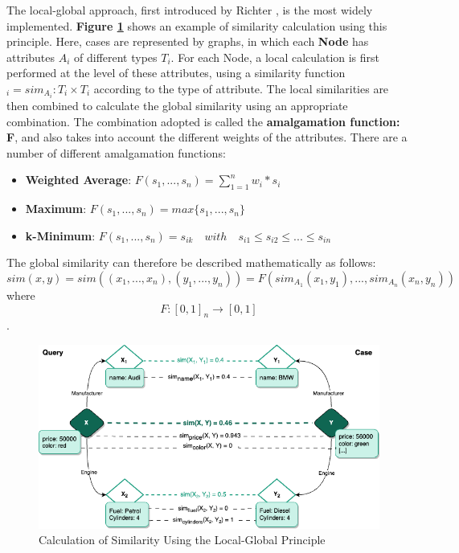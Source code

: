     The local-global approach, first introduced by Richter \cite{richter2008similarity, richter2013basic}, is the most widely implemented. \textbf{Figure \ref{fig:cbr-exam}} shows an example of similarity calculation using this principle. Here, cases are represented by graphs, in which each \textbf{Node} has attributes $A_i$ of different types $T_i$. For each Node, a local calculation is first performed at the level of these attributes, using a similarity function $_i = sim_{A_i} : T_i \times T_i$ according to the type of attribute. The local similarities are then combined to calculate the global similarity using an appropriate combination. The combination adopted is called the \textbf{amalgamation function: F}, and also takes into account the different weights of the attributes. There are a number of different amalgamation functions:
    \begin{itemize}
        \item \textbf{Weighted Average}: $F(s_1,...,s_n)= \sum_{1=1}^{n} w_i*s_i$
        \item \textbf{Maximum}: $F(s_1,...,s_n) = max\{s_1,...,s_n\}$
        \item \textbf{k-Minimum}: $F(s_1,...,s_n) = s_{ik} \quad with \quad s_{i1} \leq s_{i2} \leq ... \leq s_{in}$
    \end{itemize}
    
    The global similarity can therefore be described mathematically as follows:\\
    \[sim(x,y) = sim((x_1,...,x_n),(y_1,...,y_n)) = F(sim_{A_1}(x_1, y_1),..., sim_{A_n}(x_n, y_n) )\] where \[F: [0,1]_n \rightarrow [0,1]\].\\


    \begin{figure}[h]
    \centering
    \includegraphics[scale=0.6]{images/Concept-CBR Exemple.drawio.png}
    \caption{\label{fig:cbr-exam}  Calculation of Similarity Using the Local-Global Principle}
    \end{figure}
    
